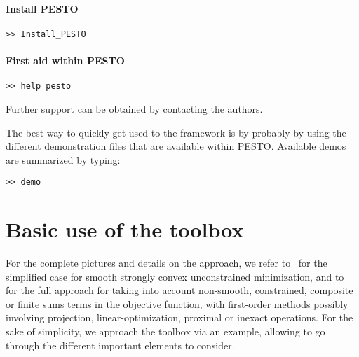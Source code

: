 \documentclass[11pt,a4paper]{article}
\newcommand{\pesto}{{PESTO }}
\begin{document}
\paragraph{Install \pesto}
\begin{verbatim}
>> Install_PESTO
\end{verbatim}

\paragraph{First aid within \pesto}
\begin{verbatim}
>> help pesto
\end{verbatim}
Further support can be obtained by contacting the authors.

The best way to quickly get used to the framework is by probably by using the different demonstration files that are available within PESTO. Available demos are summarized by typing:
\begin{verbatim}
>> demo
\end{verbatim}

\clearpage

\section{Basic use of the toolbox}	%
\label{sec:basicuse}

For the complete pictures and details on the approach, we refer to~\cite[Section 1\&3]{taylor2015smooth} for the simplified case for smooth strongly convex unconstrained minimization, and to~\cite[Section 1\&2]{taylor2015exact} for the full approach for taking into account non-smooth, constrained, composite or finite sums terms in the objective function, with first-order methods possibly involving projection, linear-optimization, proximal or inexact operations. For the sake of simplicity, we approach the toolbox via an example, allowing to go through the different important elements to consider.
\end{document}
